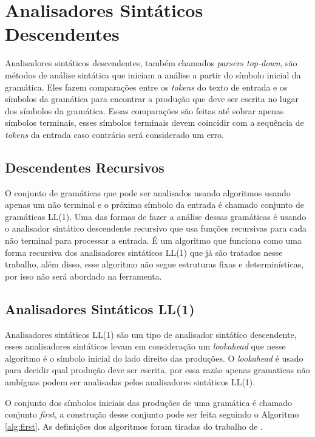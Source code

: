 \section{Analisadores Sintáticos Descendentes}
Analisadores sintáticos descendentes, também chamados \textit{parsers top-down}, são métodos de análise sintática que iniciam a análise a partir do símbolo inicial da gramática. Eles fazem comparações entre os \textit{tokens} do texto de entrada e os símbolos da gramática para encontrar a produção que deve ser escrita no lugar dos símbolos da gramática. Essas comparações são feitas até sobrar apenas símbolos terminais, esses símbolos terminais devem coincidir com a sequência de \textit{tokens} da entrada caso contrário será considerado um erro.

\subsection{Descendentes Recursivos}
O conjunto de gramáticas que pode ser analisados usando algoritmos usando apenas um não terminal e o próximo símbolo da entrada é chamado conjunto de gramáticas LL(1). Uma das formas de fazer a análise dessas gramáticas é usando o analisador sintático descendente recursivo que usa funções recursivas para cada não terminal para processar a entrada. É um algoritmo que funciona como uma forma recursiva dos analisadores sintáticos LL(1) que já são tratados nesse trabalho, além disso, esse algoritmo não segue estruturas fixas e determinísticas, por isso não será abordado na ferramenta.

\subsection{Analisadores Sintáticos LL(1)} 
Analisadores sintáticos LL(1) são um tipo de analisador sintático descendente, esses analisadores sintáticos levam em consideração um \textit{lookahead} que nesse algoritmo é o símbolo inicial do lado direito das produções. O \textit{lookahead} é usado para decidir qual produção deve ser escrita, por essa razão apenas gramaticas não ambíguas podem ser analisadas pelos analisadores sintáticos LL(1).

O conjunto dos símbolos iniciais das produções de uma gramática é chamado conjunto \textit{first}, a construção desse conjunto pode ser feita seguindo o Algoritmo \ref{alg:first}. As definições dos algoritmos foram tiradas do trabalho de \textcite{thain2020introduction}.

